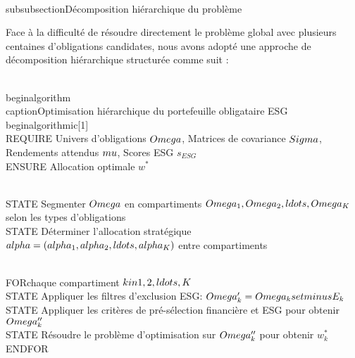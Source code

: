 \\subsubsection{Décomposition hiérarchique du problème}

Face à la difficulté de résoudre directement le problème global avec plusieurs centaines d'obligations candidates, nous avons adopté une approche de décomposition hiérarchique structurée comme suit :

\\begin{algorithm}
\\caption{Optimisation hiérarchique du portefeuille obligataire ESG}
\\begin{algorithmic}[1]
\\REQUIRE Univers d'obligations $\\Omega$, Matrices de covariance $\\Sigma$, Rendements attendus $\\mu$, Scores ESG $s_{ESG}$
\\ENSURE Allocation optimale $w^*$

\\STATE Segmenter $\\Omega$ en compartiments $\\Omega_1, \\Omega_2, \\ldots, \\Omega_K$ selon les types d'obligations
\\STATE Déterminer l'allocation stratégique $\\alpha = (\\alpha_1, \\alpha_2, \\ldots, \\alpha_K)$ entre compartiments

\\FOR{chaque compartiment $k \\in \\{1, 2, \\ldots, K\\}$}
    \\STATE Appliquer les filtres d'exclusion ESG: $\\Omega_k' = \\Omega_k \\setminus E_k$
    \\STATE Appliquer les critères de pré-sélection financière et ESG pour obtenir $\\Omega_k''$
    \\STATE Résoudre le problème d'optimisation sur $\\Omega_k''$ pour obtenir $w_k^*$
\\ENDFOR

